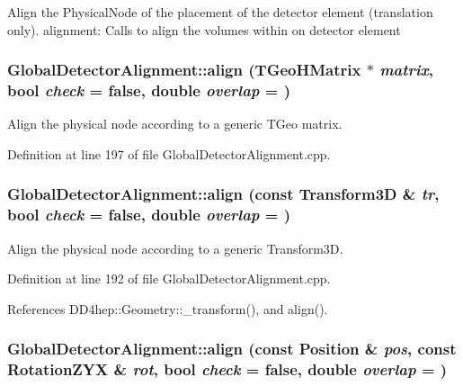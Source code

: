 Align the PhysicalNode of the placement of the detector element (translation only). alignment: Calls to align the volumes within on detector element \hypertarget{class_d_d4hep_1_1_alignments_1_1_global_detector_alignment_adbf2906a23e458e6d1630fecfe72678c}{
\subsubsection[{align}]{ GlobalDetectorAlignment::align (TGeoHMatrix $\ast$ {\em matrix}, \/  bool {\em check} = {\ttfamily false}, \/  double {\em overlap} = {})}}
\label{class_d_d4hep_1_1_alignments_1_1_global_detector_alignment_adbf2906a23e458e6d1630fecfe72678c}


Align the physical node according to a generic TGeo matrix. 

Definition at line 197 of file GlobalDetectorAlignment.cpp.\hypertarget{class_d_d4hep_1_1_alignments_1_1_global_detector_alignment_af25045f4135b7688c2ec8df38a4f6128}{
\subsubsection[{align}]{ GlobalDetectorAlignment::align (const Transform3D \& {\em tr}, \/  bool {\em check} = {\ttfamily false}, \/  double {\em overlap} = {})}}
\label{class_d_d4hep_1_1_alignments_1_1_global_detector_alignment_af25045f4135b7688c2ec8df38a4f6128}


Align the physical node according to a generic Transform3D. 

Definition at line 192 of file GlobalDetectorAlignment.cpp.

References DD4hep::Geometry::\_\-transform(), and align().\hypertarget{class_d_d4hep_1_1_alignments_1_1_global_detector_alignment_a11e7e399711724497cb9321e74e3e345}{
\subsubsection[{align}]{ GlobalDetectorAlignment::align (const Position \& {\em pos}, \/  const RotationZYX \& {\em rot}, \/  bool {\em check} = {\ttfamily false}, \/  double {\em overlap} = {})}}
\label{class_d_d4hep_1_1_alignments_1_1_global_detector_alignment_a11e7e399711724497cb9321e74e3e345}


